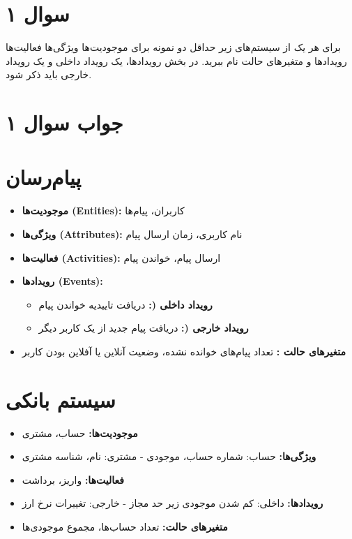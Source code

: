 \section*{سوال ۱}

برای هر یک از سیستم‌های زیر حداقل دو نمونه برای موجودیت‌ها 
ویژگی‌ها 
فعالیت‌ها 
رویدادها 
و متغیرهای حالت 
نام ببرید. در بخش رویدادها، یک رویداد داخلی 
و یک رویداد خارجی 
باید ذکر شود.

\section*{جواب سوال ۱}

\section*{پیام‌رسان}
\begin{itemize}
	\item \textbf{موجودیت‌ها (Entities):} کاربران، پیام‌ها
	\item \textbf{ویژگی‌ها (Attributes):} نام کاربری، زمان ارسال پیام
	\item \textbf{فعالیت‌ها (Activities):} ارسال پیام، خواندن پیام
	\item \textbf{رویدادها (Events):} 
	\begin{itemize}
		\item \textbf{رویداد داخلی (:} دریافت تاییدیه خواندن پیام
		\item \textbf{رویداد خارجی (:} دریافت پیام جدید از یک کاربر دیگر
	\end{itemize}
	\item \textbf{متغیرهای حالت :} تعداد پیام‌های خوانده نشده، وضعیت آنلاین یا آفلاین بودن کاربر
\end{itemize}

\section*{سیستم بانکی}
\begin{itemize}
	\item \textbf{موجودیت‌ها:} حساب، مشتری
	\item \textbf{ویژگی‌ها:} حساب: شماره حساب، موجودی - مشتری: نام، شناسه مشتری
	\item \textbf{فعالیت‌ها:} واریز، برداشت
	\item \textbf{رویدادها:} داخلی: کم شدن موجودی زیر حد مجاز - خارجی: تغییرات نرخ ارز
	\item \textbf{متغیرهای حالت:} تعداد حساب‌ها، مجموع موجودی‌ها
\end{itemize}

